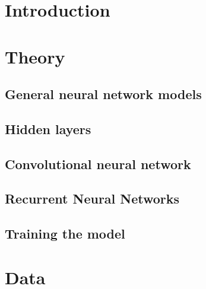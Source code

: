 \documentclass[a4paper]{article}
\begin{document}
\maketitle

\newpage
\tableofcontents
\newpage

\section{Introduction}

\section{Theory}
\subsection{General neural network models} %


\subsection{Hidden layers} %


\subsection{Convolutional neural network} %


\subsection{Recurrent Neural Networks} %


\subsection{Training the model}


\section{Data} %

\end{document}
